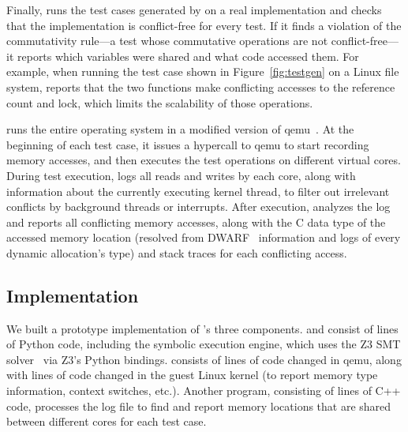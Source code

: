 Finally, \mtrace runs the test cases generated by \generator on
a real implementation and checks that the implementation is
conflict-free for every test.  If it finds a violation of the
commutativity rule---a test whose commutative operations are not
conflict-free---it reports which variables were shared and what code
accessed them.
%
For example, when running the
test case shown in Figure~\ref{fig:testgen} on a Linux 
file system, \mtrace{} reports that the two functions make conflicting
accesses to the  reference count and lock, which limits
the scalability of those operations.

\mtrace{} runs the entire operating system in a modified version of
qemu~\cite{qemu}.  At the beginning of each test case, it issues a hypercall to
qemu to start recording memory accesses, and then executes the test
operations on different virtual cores.  During test execution,
\mtrace{} logs all reads and writes by each core, along with
information about the currently executing kernel thread,
to filter out irrelevant conflicts by background threads or
interrupts.  After execution, \mtrace analyzes
the log and reports all conflicting memory accesses, along with the C
data type of the accessed memory location (resolved from
DWARF~\cite{dwarf} information and logs
of every dynamic allocation's type) and stack traces for each conflicting
access.

\subsection{Implementation}
\label{sec:model:impl}

We built a prototype implementation of \tool{}'s three components.
\analyzer{} and \generator{} consist of
 lines of Python code,
including the symbolic execution engine, which uses the Z3 SMT
solver~\cite{demoura:z3}
via Z3's Python bindings.
\mtrace{} consists of  lines of
code changed in qemu, along with 
lines of code changed in the guest
Linux kernel (to report memory type information, context switches, etc.).
Another program, consisting of 
lines of C++ code, processes the
log file to find and report memory locations that are shared between different
cores for each test case.



